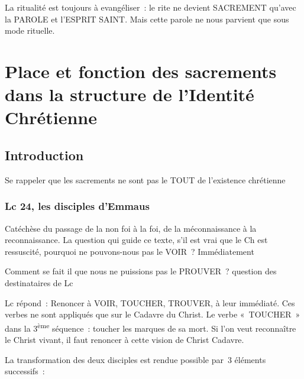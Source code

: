 La ritualité est toujours à evangéliser~: le rite ne devient SACREMENT
qu'avec la PAROLE et l'ESPRIT SAINT. Mais cette parole ne nous parvient
que sous mode rituelle.

\chapter{Place et fonction des sacrements dans la structure de l'Identité
Chrétienne}

 


\hypertarget{i.-introduction}{%
\section{Introduction}\label{i.-introduction}}

Se rappeler que les sacrements ne sont pas le TOUT de l'existence
chrétienne

\hypertarget{lc-24-les-disciples-demmaus}{%
\subsection{Lc 24, les disciples
d'Emmaus}\label{lc-24-les-disciples-demmaus}}

Catéchèse du passage de la non foi à la foi, de la méconnaissance à la
reconnaissance. La question qui guide ce texte, s'il est vrai que le Ch
est ressuscité, pourquoi ne pouvons-nous pas le VOIR~? Immédiatement

Comment se fait il que nous ne puissions pas le PROUVER~? question des
destinataires de Lc

Lc répond~: Renoncer à VOIR, TOUCHER, TROUVER, à leur immédiaté. Ces
verbes ne sont appliqués que sur le Cadavre du Christ. Le verbe
«~TOUCHER~» dans la 3\textsuperscript{ème} séquence~: toucher les
marques de sa mort. Si l'on veut reconnaître le Christ vivant, il faut
renoncer à cette vision de Christ Cadavre.

La transformation des deux disciples est rendue possible par~3 éléments
successifs~:

